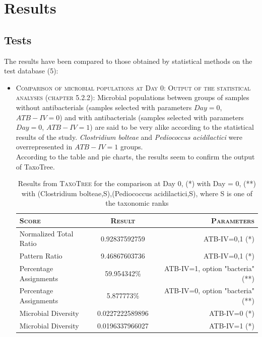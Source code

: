 \documentclass{report}
\begin{document}
\section{Results}

\subsection{Tests}

The results have been compared to those obtained by statistical methods on the test database (5):

\begin{itemize}
\item \textsc{Comparison of microbial populations at Day 0:} 
       \textsc{Output of the statistical analyses (chapter 5.2.2):} Microbial populations between groups of samples without antibacterials (samples selected with parameters $Day = 0$, $ATB-IV = 0$) and with antibacterials (samples selected with parameters $Day = 0$, $ATB-IV = 1$) are said to be very alike according to the statistical results of the study. \emph{Clostridium bolteae} and \emph{Pediococcus acidilactici} were overrepresented in $ATB-IV = 1$ groups.\\

According to the table and pie charts, the results seem to confirm the output of TaxoTree.

     \begin{table}
       \caption{Results from \textsc{TaxoTree} for the comparison at Day 0, (*) with Day = 0, (**) with (Clostridium bolteae,S),(Pediococcus acidilactici,S), where S is one of the taxonomic ranks}
       \begin{tabular}{|l|c|r|}
         \hline
         \textsc{Score} & \textsc{Result} & \textsc{Parameters}\\
         \hline
         Normalized Total Ratio & 0.92837592759 & ATB-IV=0,1 (*)\\
         \hline
         Pattern Ratio & 9.46867603736 & ATB-IV=0,1 (*)\\
         \hline
         Percentage Assignments & 59.954342\% & ATB-IV=1, option "bacteria" (**)\\
         \hline
         Percentage Assignments & 5.877773\% & ATB-IV=0, option "bacteria" (**)\\
         \hline
         Microbial Diversity & 0.0227222589896 & ATB-IV=0 (*) \\
         \hline
         Microbial Diversity & 0.0196337966027 & ATB-IV=1 (*) \\
         \hline
       \end{tabular}
     \end{table}
       

\end{itemize}
\end{document}
